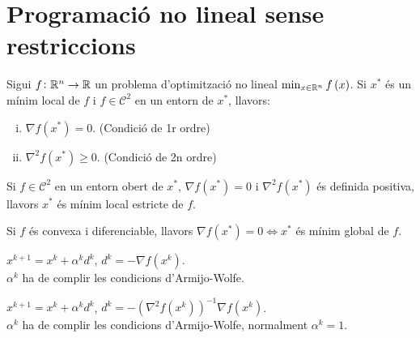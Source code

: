 \section{Programaci\'o no lineal sense restriccions}

\begin{teo*}
    Sigui $f \colon \mathbb{R}^n \to \mathbb{R}$ un problema d'optimitzaci\'o no lineal $\min_{x\in\mathbb{R}^n} f\left( x \right)$. Si $x^*$ \'es un m\'inim local de $f$ i $f \in \mathcal{C}^2$ en un entorn de $x^*$, llavors:
    \begin{enumerate}[i)]
        \item $\nabla f\left( x^* \right) = 0$. (Condici\'o de 1r ordre)
        \item $\nabla^2 f\left( x^* \right) \geq 0$. (Condici\'o de 2n ordre)
    \end{enumerate}
\end{teo*}
\begin{teo*}
    Si $f \in \mathcal{C}^2$ en un entorn obert de $x^*$, $\nabla f\left( x^* \right) = 0$ i $\nabla^2 f\left( x^* \right)$ \'es definida positiva, llavors $x^*$ \'es m\'inim local estricte de $f$.
\end{teo*}
\begin{teo*}
    Si $f$ \'es convexa i diferenciable, llavors $\nabla f\left( x^* \right) = 0 \iff x^*$ \'es m\'inim global de $f$.
\end{teo*}
\begin{met}
    $x^{k+1} = x^k + \alpha^kd^k$, \quad $d^k = -\nabla f\left( x^k \right)$. \\
    $\alpha^k$ ha de complir les condicions d'Armijo-Wolfe.
\end{met}
\begin{met}[de Newton]
    $x^{k+1} = x^k + \alpha^kd^k$, \quad $d^k = -\left( \nabla^2 f\left( x^k \right) \right)^{-1} \nabla f\left( x^k \right)$. \\
    $\alpha^k$ ha de complir les condicions d'Armijo-Wolfe, normalment $\alpha^k = 1$.
\end{met}
